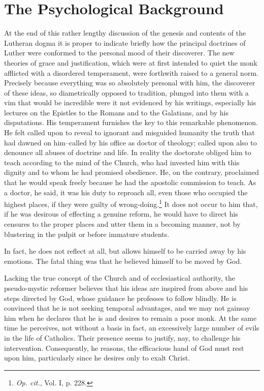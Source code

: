 \section{The Psychological Background}

At the end of this rather lengthy discussion of the genesis and
contents of the Lutheran dogma it is proper to indicate briefly how
the principal doctrines of Luther were conformed to the personal
mood of their discoverer. The new theories of grace and justification,
which were at first intended to quiet the monk afflicted
with a disordered temperament, were forthwith raised to a general
norm. Precisely because everything was so absolutely personal with
him, the discoverer of these ideas, so diametrically opposed to tradition,
plunged into them with a vim that would be incredible were
it not evidenced by his writings, especially his lectures on the
Epistles to the Romans and to the Galatians, and by his disputations. His
temperament furnishes the key to this remarkable phenomenon. He felt called
upon to reveal to ignorant and misguided
humanity the truth that had dawned on him--called by his office as
doctor of theology; called upon also to denounce all abuses of doctrine
and life. In reality the doctorate obliged him to teach according
to the mind of the Church, who had invested him with this dignity
and to whom he had promised obedience. He, on the contrary, proclaimed
that he would speak freely because he had the apostolic
commission to teach. As a doctor, he said, it was his duty to reproach
all, even those who occupied the highest places, if they were
guilty of wrong-doing.\footnote{\textit{Op. cit.}, Vol. I, p. 228.}
It does not occur to him that, if he was
desirous of effecting a genuine reform, he would have to direct his
censures to the proper places and utter them in a becoming manner,
not by blustering in the pulpit or before immature students.

In fact, he does not reflect at all, but allows himself to be carried
away by his emotions. The fatal thing was that he believed himself to be moved by God.

Lacking the true concept of the Church and of ecclesiastical authority,
the pseudo-mystic reformer believes that his ideas are inspired
from above and his steps directed by God, whose guidance
he professes to follow blindly. He is convinced that he is not seeking
temporal advantages, and we may not gainsay him when he
declares that he is and desires to remain a poor monk. At the same
time he perceives, not without a basis in fact, an excessively large
number of evils in the life of Catholics. Their presence seems
to justify, nay, to challenge his intervention. Consequently, he reasons,
the efficacious hand of God must rest upon him, particularly
since he desires only to exalt Christ.

